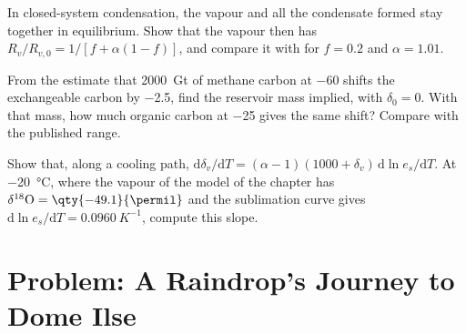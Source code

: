 \begin{exercise}[$\star\star\star$]\label{exo:b3:stable-isotopes:10}
In closed-system condensation, the vapour and all the condensate formed stay
together in equilibrium. Show that the vapour then has $R_v/R_{v,0} = 1/[f +
\alpha(1 - f)]$, and compare it with  for $f = 0.2$ and
$\alpha = 1.01$.
\end{exercise}

\begin{exercise}[$\star\star\star$]\label{exo:b3:stable-isotopes:11}
From the estimate that \qty{2000}{Gt} of methane carbon at
\qty{-60}{\permil} shifts the exchangeable carbon by \qty{-2.5}{\permil},
find the reservoir mass implied, with $\delta_0 = 0$. With that mass, how much
organic carbon at \qty{-25}{\permil} gives the same shift? Compare with the
published range.
\end{exercise}

\begin{exercise}[$\star\star\star$]\label{exo:b3:stable-isotopes:12}
Show that, along a cooling path, $\mathrm d\delta_v/\mathrm dT = (\alpha - 1)(1000 +
\delta_v)\,\mathrm d\ln e_s/\mathrm dT$. At \qty{-20}{\celsius}, where the
vapour of the model of the chapter has $\delta^{18}\mathrm O = \qty{-49.1}{\permil}$
and the sublimation curve gives $\mathrm d\ln e_s/\mathrm dT =
\qty{0.0960}{K^{-1}}$, compute this slope.
\end{exercise}

\section{Problem: A Raindrop's Journey to Dome Ilse}

